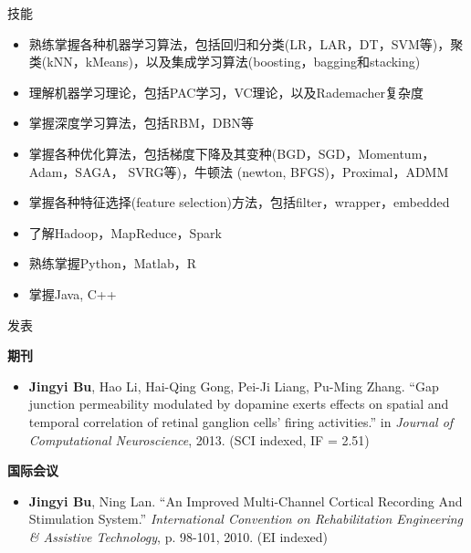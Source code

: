 \documentclass{resume} %
\begin{document}

\begin{rSection}{技能}

\begin{itemize}
	\item 熟练掌握各种机器学习算法，包括回归和分类(LR，LAR，DT，SVM等)，聚类(kNN，kMeans)，以及集成学习算法(boosting，bagging和stacking)
	\item 理解机器学习理论，包括PAC学习，VC理论，以及Rademacher复杂度
	\item 掌握深度学习算法，包括RBM，DBN等
	\item 掌握各种优化算法，包括梯度下降及其变种(BGD，SGD，Momentum，Adam，SAGA， SVRG等)，牛顿法 (newton, BFGS)，Proximal，ADMM 
	\item 掌握各种特征选择(feature selection)方法，包括filter，wrapper，embedded
	\item 了解Hadoop，MapReduce，Spark
	\item 熟练掌握Python，Matlab，R
	\item 掌握Java, C++
\end{itemize}

\end{rSection}


\begin{rSection}{发表}

{\bf 期刊}
\begin{itemize}\small
\item {\bf Jingyi Bu}, Hao Li, Hai-Qing Gong, Pei-Ji Liang, Pu-Ming Zhang. ``Gap junction permeability modulated by dopamine exerts effects on spatial and temporal correlation of retinal ganglion cells’ firing activities.'' in {\em Journal of Computational Neuroscience}, 2013. (SCI indexed, IF = 2.51) 
\end{itemize}


{\bf 国际会议}
\begin{itemize}\small
\item {\bf Jingyi Bu}, Ning Lan.  ``An Improved Multi-Channel Cortical Recording And Stimulation System.'' {\em International Convention on Rehabilitation Engineering \& Assistive Technology}, p. 98-101, 2010. (EI indexed)
\end{itemize}

\end{rSection}
\end{document}
